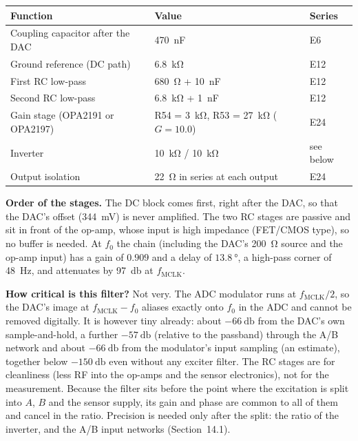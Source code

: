 \documentclass[11pt,a4paper]{article}
\begin{document}
\begin{center}
\small
\begin{tabular}{@{}p{}p{}p{}@{}}
\toprule
Function & Value & Series \\
\midrule
Coupling capacitor after the DAC & \SI{470}{\nano\farad} & E6 \\
Ground reference (DC path) & \SI{6.8}{\kilo\ohm} & E12 \\
First RC low-pass & \SI{680}{\ohm} + \SI{10}{\nano\farad} & E12 \\
Second RC low-pass & \SI{6.8}{\kilo\ohm} + \SI{1}{\nano\farad} & E12 \\
Gain stage (OPA2191 or OPA2197) & R54 = \SI{3}{\kilo\ohm}, R53 = \SI{27}{\kilo\ohm} ($G=10.0$) & E24 \\
Inverter & \SI{10}{\kilo\ohm} / \SI{10}{\kilo\ohm} & see below \\
Output isolation & \SI{22}{\ohm} in series at each output & E24 \\
\bottomrule
\end{tabular}
\end{center}

\textbf{Order of the stages.}  The DC block comes first, right after the DAC, so that the
DAC's offset (\SI{344}{\milli\volt}) is never amplified.  The two RC stages are passive and
sit in front of the op-amp, whose input is high impedance (FET/CMOS type), so no buffer is
needed.  At $f_0$ the chain (including the DAC's \SI{200}{\ohm} source and the op-amp input)
has a gain of $0.909$ and a delay of $\SI{13.8}{\degree}$, a high-pass corner of
\SI{48}{\hertz}, and attenuates by \SI{97}{\decibel} at $f_{\mathrm{MCLK}}$.

\textbf{How critical is this filter?}  Not very.  The ADC modulator runs at
$f_{\mathrm{MCLK}}/2$, so the DAC's image at $f_{\mathrm{MCLK}}-f_0$ aliases exactly onto
$f_0$ in the ADC and cannot be removed digitally.  It is however tiny already: about
$\SI{-66}{\decibel}$ from the DAC's own sample-and-hold, a further $\SI{-57}{\decibel}$
(relative to the passband) through the A/B network and about $\SI{-66}{\decibel}$ from the
modulator's input sampling (an estimate), together below $\SI{-150}{\decibel}$ even without
any exciter filter.  The RC stages are for cleanliness (less RF into the op-amps and the sensor
electronics), not for the measurement.  Because the filter sits before the point where the
excitation is split into $A$, $B$ and the sensor supply, its gain and phase are common to all
of them and cancel in the ratio.  Precision is needed only after the split: the ratio of the
inverter, and the A/B input networks (Section~14.1).
\end{document}
